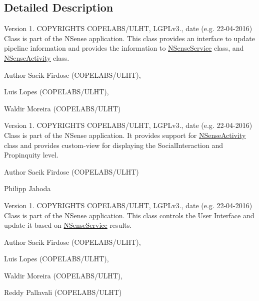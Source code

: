 \subsection{Detailed Description}
\begin{DoxyVersion}{Version}
1. C\-O\-P\-Y\-R\-I\-G\-H\-T\-S C\-O\-P\-E\-L\-A\-B\-S/\-U\-L\-H\-T, L\-G\-P\-Lv3., date (e.\-g. 22-\/04-\/2016) Class is part of the N\-Sense application. This class provides an interface to update pipeline information and provides the information to \hyperlink{classcs_1_1nsense_1_1_n_sense_service}{N\-Sense\-Service} class, and \hyperlink{classcs_1_1nsense_1_1_n_sense_activity}{N\-Sense\-Activity} class. 
\end{DoxyVersion}
\begin{DoxyAuthor}{Author}
Saeik Firdose (C\-O\-P\-E\-L\-A\-B\-S/\-U\-L\-H\-T), 

Luis Lopes (C\-O\-P\-E\-L\-A\-B\-S/\-U\-L\-H\-T), 

Waldir Moreira (C\-O\-P\-E\-L\-A\-B\-S/\-U\-L\-H\-T)
\end{DoxyAuthor}
\begin{DoxyVersion}{Version}
1. C\-O\-P\-Y\-R\-I\-G\-H\-T\-S C\-O\-P\-E\-L\-A\-B\-S/\-U\-L\-H\-T, L\-G\-P\-Lv3., date (e.\-g. 22-\/04-\/2016) Class is part of the N\-Sense application. It provides support for \hyperlink{classcs_1_1nsense_1_1_n_sense_activity}{N\-Sense\-Activity} class and provides custom-\/view for displaying the Social\-Interaction and Propinquity level. 
\end{DoxyVersion}
\begin{DoxyAuthor}{Author}
Saeik Firdose (C\-O\-P\-E\-L\-A\-B\-S/\-U\-L\-H\-T) 

Philipp Jahoda
\end{DoxyAuthor}
\begin{DoxyVersion}{Version}
1. C\-O\-P\-Y\-R\-I\-G\-H\-T\-S C\-O\-P\-E\-L\-A\-B\-S/\-U\-L\-H\-T, L\-G\-P\-Lv3., date (e.\-g. 22-\/04-\/2016) Class is part of the N\-Sense application. This class controls the User Interface and update it based on \hyperlink{classcs_1_1nsense_1_1_n_sense_service}{N\-Sense\-Service} results. 
\end{DoxyVersion}
\begin{DoxyAuthor}{Author}
Saeik Firdose (C\-O\-P\-E\-L\-A\-B\-S/\-U\-L\-H\-T), 

Luis Lopes (C\-O\-P\-E\-L\-A\-B\-S/\-U\-L\-H\-T), 

Waldir Moreira (C\-O\-P\-E\-L\-A\-B\-S/\-U\-L\-H\-T), 

Reddy Pallavali (C\-O\-P\-E\-L\-A\-B\-S/\-U\-L\-H\-T)
\end{DoxyAuthor}
